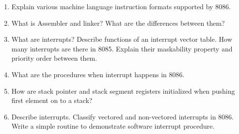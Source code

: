 \documentclass[12pt, a4paper]{scrartcl}
\begin{document}
\begin{enumerate}
		\item Explain various machine language instruction formats supported by 8086.
		\item What is Assembler and linker? What are the differences between them?
		\item What are interrupts? Describe functions of an interrupt vector table. How many interrupts are there in 8085. Explain their maskability property and priority order between them.
		\item What are the procedures when interrupt happens in 8086. 
		\item How are stack pointer and stack segment registers initialized when pushing first element on to a stack?
		\item Describe interrupts. Classify vectored and non-vectored interrupts in 8086. Write a simple routine to demonstrate software interrupt procedure.
	\end{enumerate}
\end{document}
